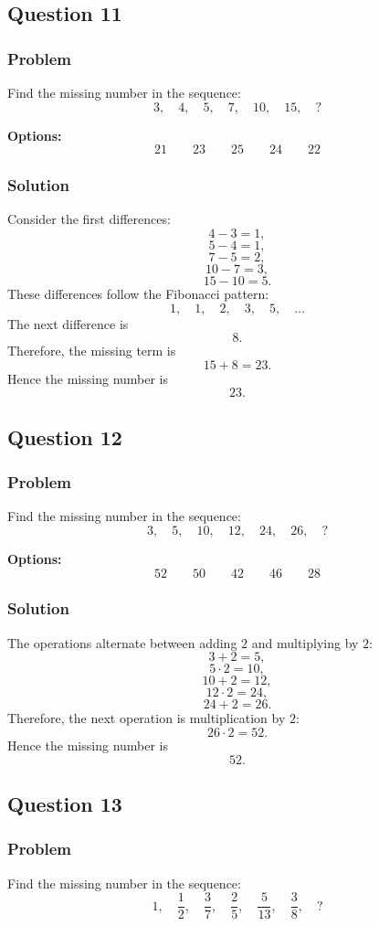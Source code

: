 \documentclass[12pt]{article}
\begin{document}
\subsection{Question 11}
\subsubsection{Problem}
Find the missing number in the sequence:
\[
3,\quad 4,\quad 5,\quad 7,\quad 10,\quad 15,\quad ?
\]

\noindent\textbf{Options:}
\[
\boxed{21}
\qquad
\boxed{23}
\qquad
\boxed{25}
\qquad
\boxed{24}
\qquad
\boxed{22}
\]

\subsubsection{Solution}
Consider the first differences:
\[
4-3=1,
\]
\[
5-4=1,
\]
\[
7-5=2,
\]
\[
10-7=3,
\]
\[
15-10=5.
\]
These differences follow the Fibonacci pattern:
\[
1,\quad 1,\quad 2,\quad 3,\quad 5,\quad \ldots
\]
The next difference is
\[
8.
\]
Therefore, the missing term is
\[
15+8=23.
\]
Hence the missing number is
\[
\boxed{23}.
\]

\subsection{Question 12}
\subsubsection{Problem}
Find the missing number in the sequence:
\[
3,\quad 5,\quad 10,\quad 12,\quad 24,\quad 26,\quad ?
\]

\noindent\textbf{Options:}
\[
\boxed{52}
\qquad
\boxed{50}
\qquad
\boxed{42}
\qquad
\boxed{46}
\qquad
\boxed{28}
\]

\subsubsection{Solution}
The operations alternate between adding \(2\) and multiplying by \(2\):
\[
3+2=5,
\]
\[
5\cdot 2=10,
\]
\[
10+2=12,
\]
\[
12\cdot 2=24,
\]
\[
24+2=26.
\]
Therefore, the next operation is multiplication by \(2\):
\[
26\cdot 2=52.
\]
Hence the missing number is
\[
\boxed{52}.
\]

\subsection{Question 13}
\subsubsection{Problem}
Find the missing number in the sequence:
\[
1,\quad \frac{1}{2},\quad \frac{3}{7},\quad \frac{2}{5},\quad \frac{5}{13},\quad \frac{3}{8},\quad ?
\]
\end{document}
